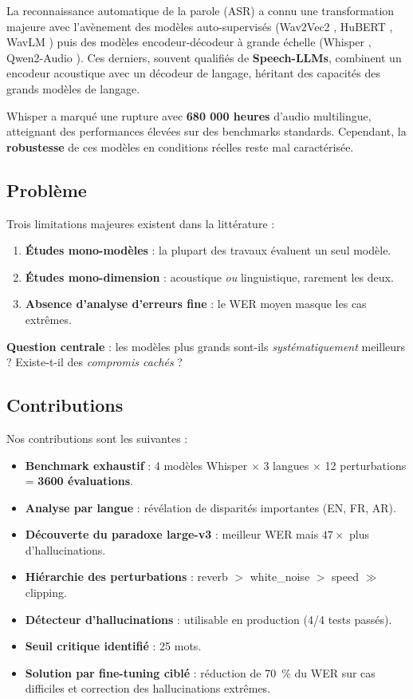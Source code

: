 \documentclass[11pt,a4paper]{article}
\begin{document}
La reconnaissance automatique de la parole (ASR) a connu une transformation
majeure avec l'avènement des modèles auto-supervisés (Wav2Vec2
\cite{baevski2020wav2vec}, HuBERT \cite{hsu2021hubert}, WavLM
\cite{chen2022wavlm}) puis des modèles encodeur-décodeur à grande échelle
(Whisper \cite{radford2022whisper}, Qwen2-Audio \cite{chu2024qwen2audio}).
Ces derniers, souvent qualifiés de \textbf{Speech-LLMs}, combinent un encodeur
acoustique avec un décodeur de langage, héritant des capacités des grands
modèles de langage.

Whisper \cite{radford2022whisper} a marqué une rupture avec \textbf{680 000
heures} d'audio multilingue, atteignant des performances élevées sur des
benchmarks standards. Cependant, la \textbf{robustesse} de ces modèles en
conditions réelles reste mal caractérisée.

\subsection{Problème}

Trois limitations majeures existent dans la littérature :

\begin{enumerate}
    \item \textbf{Études mono-modèles} : la plupart des travaux évaluent un
    seul modèle.
    \item \textbf{Études mono-dimension} : acoustique \textit{ou} linguistique,
    rarement les deux.
    \item \textbf{Absence d'analyse d'erreurs fine} : le WER moyen masque les
    cas extrêmes.
\end{enumerate}

\noindent
\textbf{Question centrale} : les modèles plus grands sont-ils
\textit{systématiquement} meilleurs ? Existe-t-il des \textit{compromis
cachés} ?

\subsection{Contributions}

Nos contributions sont les suivantes :

\begin{itemize}
	\item \textbf{Benchmark exhaustif} : 4 modèles Whisper $\times$ 3 langues
	$\times$ 12 perturbations = \textbf{3600 évaluations}.
	\item \textbf{Analyse par langue} : révélation de disparités importantes
	(EN, FR, AR).
	\item \textbf{Découverte du paradoxe large-v3} : meilleur WER mais
	$47\times$ plus d'hallucinations.
	\item \textbf{Hiérarchie des perturbations} : reverb $>$ white\_noise
	$>$ speed $\gg$ clipping.
	\item \textbf{Détecteur d'hallucinations} : utilisable en production
	(4/4 tests passés).
	\item \textbf{Seuil critique identifié} : 25 mots.
	\item \textbf{Solution par fine-tuning ciblé} : réduction de 70~\% du WER
	sur cas difficiles et correction des hallucinations extrêmes.
\end{itemize}
\end{document}
